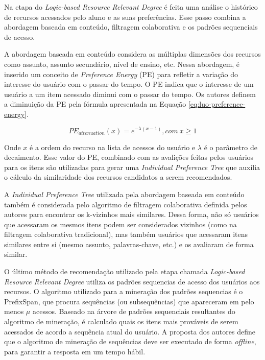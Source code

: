 Na etapa do \textit{Logic-based Resource Relevant Degree} é feita uma análise o histórico de recursos acessados pelo aluno e as
suas preferências. Esse passo combina a abordagem baseada em conteúdo, filtragem colaborativa e os padrões sequenciais
de acesso.

A abordagem baseada em conteúdo considera as múltiplas dimensões dos recursos como assunto, assunto secundário, nível
de ensino, etc. Nessa abordagem, é inserido um conceito de \textit{Preference Energy} (PE) para refletir a variação do interesse
do usuário com o passar do tempo. O PE indica que o interesse de um usuário a um item acessado diminui com o passar do
tempo. Os autores definem a diminuição da PE pela fórmula apresentada na Equação \ref{eq:luo-preference-energy}.

\begin{equation}
  \label{eq:luo-preference-energy}
  PE_{attenuation}(x) = e^{- \lambda (x-1)}, com \ x \geqslant 1
\end{equation}

Onde $x$ é a ordem do recurso na lista de acessos do usuário e $\lambda$ é o parâmetro de decaimento. Esse valor do PE,
combinado com as avalições feitas pelos usuários para os itens são utilizadas para gerar uma \textit{Individual Preference Tree}
que auxilia o cálculo da similaridade dos recursos candidatos a serem recomendados.

A \textit{Individual Preference Tree} utilizada pela abordagem baseada em conteúdo também é considerada pelo algoritmo de
filtragem colaborativa definida pelos autores para encontrar os k-vizinhos mais similares. Dessa forma, não só usuários
que acessaram os mesmos itens podem ser considerados vizinhos (como na filtragem colaborativa tradicional), mas também
usuários que acessaram itens similares entre si (mesmo assunto, palavras-chave, etc.) e os avaliaram de forma similar.

O último método de recomendação utilizado pela etapa chamada \textit{Logic-based Resource Relevant Degree} utiliza os padrões
sequencias de acesso dos usuários aos recursos. O algoritmo utilizado para a mineração dos padrões sequencias é o
PrefixSpan, que procura sequências (ou subsequências) que apareceram em pelo menos $\mu$ acessos. Baseado na árvore de
padrões sequenciais resultantes do algoritmo de mineração, é calculado quais os itens mais prováveis de serem acessados
de acordo a sequência atual do usuário. A proposta dos autores define que o algoritmo de mineração de sequências deve
ser executado de forma \textit{offline}, para garantir a resposta em um tempo hábil.

